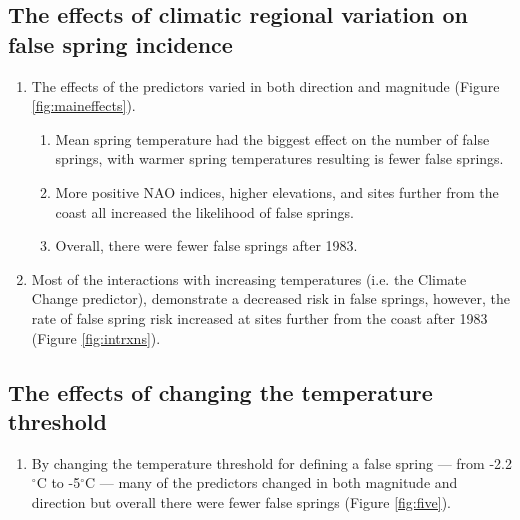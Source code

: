\documentclass{article}\usepackage[]{graphicx}\usepackage[]{color}
\begin{document}
\subsection*{The effects of climatic regional variation on false spring incidence}
\begin{enumerate}
\item The effects of the predictors varied in both direction and magnitude (Figure \ref{fig:maineffects}).
  \begin{enumerate}
  \item Mean spring temperature had the biggest effect on the number of false springs, with warmer spring temperatures resulting is fewer false springs. 
  \item More positive NAO indices, higher elevations, and sites further from the coast all increased the likelihood of false springs. 
  \item Overall, there were fewer false springs after 1983. 
  \end{enumerate}
\item Most of the interactions with increasing temperatures (i.e. the Climate Change predictor), demonstrate a decreased risk in false springs, however, the rate of false spring risk increased at sites further from the coast after 1983 (Figure \ref{fig:intrxns}). 
\end{enumerate}

\subsection*{The effects of changing the temperature threshold}
\begin{enumerate}
\item By changing the temperature threshold for defining a false spring --- from -2.2$^{\circ}$C to -5$^{\circ}$C --- many of the predictors changed in both magnitude and direction but overall there were fewer false springs (Figure \ref{fig:five}).
\end{enumerate}
\end{document}
